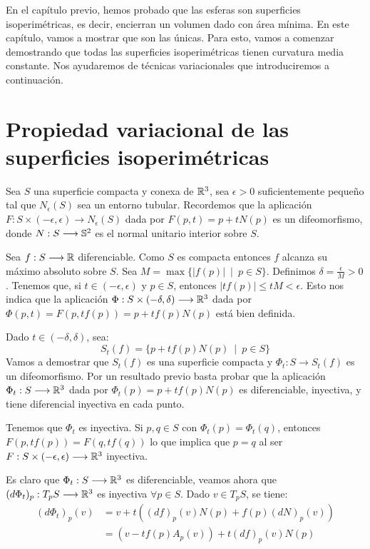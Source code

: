 \label{chapter:uniquenesssphere}
En el capítulo previo, hemos probado que las esferas son superficies isoperimétricas, es decir,  encierran un volumen dado con área mínima. En este capítulo, vamos a mostrar que son las únicas. Para esto, vamos a comenzar demostrando que todas las superficies isoperimétricas tienen curvatura media constante. Nos ayudaremos de técnicas variacionales que introduciremos a continuación.

\section{Propiedad variacional de las superficies isoperimétricas}

Sea $S$ una superficie compacta y conexa de $\mathbb{R}^3$, sea $\epsilon > 0$ suficientemente pequeño tal que $N_\epsilon(S)$ sea un entorno tubular. Recordemos que la aplicación $F: S \times (-\epsilon, \epsilon) \longrightarrow N_\epsilon(S)$ dada por $F(p,t)=p + tN(p)$ es un difeomorfismo, donde $N: S \longrightarrow \mathbb{S}^2$ es el normal unitario interior sobre $S$.

Sea $f: S \longrightarrow \mathbb{R}$ diferenciable. Como $S$ es compacta entonces $f$ alcanza su máximo absoluto sobre $S$. Sea $M=\max \{ |f(p)| \enspace | \enspace p \in S \}$. Definimos $\delta = \frac{\epsilon}{M} > 0$. Tenemos que, si $t \in (-\epsilon, \epsilon)$ y $p\in S$, entonces $|tf(p)| \leq tM < \epsilon$. Esto nos indica que la aplicación $\Phi: S \times (-\delta, \delta) \longrightarrow \mathbb{R}^3$ dada por $\Phi(p,t) = F(p, tf(p)) = p + tf(p)N(p)$ está bien definida.

Dado $t \in (-\delta, \delta)$, sea:
%
\begin{equation*}
    S_t(f) = \{ p + tf(p)N(p) \enspace | \enspace p \in S \}
\end{equation*}
%
Vamos a demostrar que $S_t(f)$ es una superficie compacta y $\Phi_t: S \longrightarrow S_t(f)$ es un difeomorfismo. Por un resultado previo basta probar que la aplicación $\Phi_t: S \longrightarrow \mathbb{R}^3$ dada por $\Phi_t(p)=p+tf(p)N(p)$ es diferenciable, inyectiva, y tiene diferencial inyectiva en cada punto.

Tenemos que $\Phi_t$ es inyectiva. Si $p,q \in S$ con $\Phi_t(p) = \Phi_t(q)$, entonces $F(p, tf(p)) = F(q, tf(q))$ lo que implica que $p=q$ al ser $F: S \times (-\epsilon, \epsilon) \longrightarrow \mathbb{R}^3$ inyectiva.

Es claro que $\Phi_t: S \longrightarrow \mathbb{R}^3$ es diferenciable,  veamos ahora que $(d\Phi_t)_p: T_pS \longrightarrow \mathbb{R}^3$ es inyectiva $\forall p \in S$. Dado $v \in T_pS$, se tiene:
%
\begin{align*}
    (d\Phi_t)_p(v) &= v + t \left( (df)_p(v)N(p) + f(p)(dN)_p(v) \right) \\
    &= \left( v - tf(p)A_p(v) \right) + t(df)_p(v)N(p)
\end{align*}

